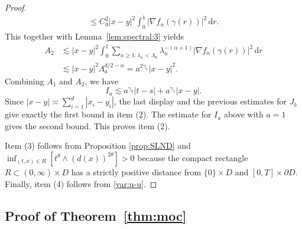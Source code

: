 \documentclass[reqno]{amsart}
\DeclareMathOperator{\Var}{Var}
\renewcommand{\d}{\mathrm d}
\newcommand{\1}{\mathbf 1}
\numberwithin{equation}{section}
\theoremstyle{definition}
\begin{document}
\begin{proof}
\begin{align*}
    \le C_0^2 |x-y|^2 \int_0^1 |\nabla f_n(\gamma(r))|^2\,\d r.
\end{align*}
This together with Lemma~\ref{lem:spectral:3} yields
\begin{align*}
    A_2
    &\lesssim
    |x-y|^2 \int_0^1
    \sum_{n \ge 1: \lambda_n<\Lambda_a}
    \lambda_n^{-(\alpha+1)}|\nabla f_n(\gamma(r))|^2\,\d r\\
    &\lesssim
    |x-y|^2\Lambda_a^{d/2-\alpha}
    =
    a^{2\gamma_1}|x-y|^2 .
\end{align*}
Combining \(A_1\) and \(A_2\), we have
\[
    I_a
    \lesssim
    a^{\gamma_0}|t-s|+a^{\gamma_1}|x-y|.
\]
Since \(|x-y|\asymp \sum_{i=1}^d|x_i-y_i|\), the last display and the
previous estimates for $J_b$ give exactly the first bound in item (2). 
The estimate for $I_a$ above with $a=1$ gives the second bound.
This proves item (2).

Item (3) follows from Proposition \ref{prop:SLND} and
$\inf_{(t,x) \in R}[t^\theta \wedge (d(x))^{2\theta}] > 0$ because the compact rectangle $R \subset (0,\infty) \times D$ has a strictly positive distance from $\{0\} \times D$ and $[0,T] \times \partial D$.
Finally, item (4) follows from \eqref{var:u-u}.
\end{proof}

\subsection{Proof of Theorem~\ref{thm:moc}}
\end{document}
